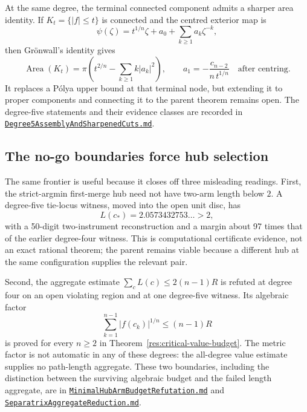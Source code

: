 At the same degree, the terminal connected component admits a sharper area
identity.  If $K_t=\{|f|\le t\}$ is connected and the centred exterior map is
\[
 \psi(\zeta)=t^{1/n}\zeta+a_0+
 \sum_{k\ge1}a_k\zeta^{-k},
\]
then Gr\"onwall's identity gives
\[
 \operatorname{Area}(K_t)=\pi\left(t^{2/n}-
 \sum_{k\ge1}k|a_k|^2\right),
 \qquad
 a_1=-\frac{c_{n-2}}{n\,t^{1/n}}
 \quad\text{after centring}.
\]
It replaces a P\'olya upper bound at that terminal node, but extending it to
proper components and connecting it to the parent theorem remains open.  The
degree-five statements and their evidence classes are recorded in
\href{https://github.com/wcook04/plectis-erdos/blob/f214a6b45528dc5eefe20ffadc35f2e981627d4c/research_corpus/Erdos1041/Degree5AssemblyAndSharpenedCuts.md}{\texttt{Degree5AssemblyAndSharpenedCuts.md}}.

\subsection*{The no-go boundaries force hub selection}

The same frontier is useful because it closes off three misleading readings.
First, the strict-argmin first-merge hub need not have two-arm length below
$2$.  A degree-five tie-locus witness, moved into the open unit disc, has
\[
 L(c_*)=2.0573432753\ldots>2,
\]
with a 50-digit two-instrument reconstruction and a margin about 97 times
that of the earlier degree-four witness.  This is computational certificate
evidence, not an exact rational theorem; the parent remains viable because a
different hub at the same configuration supplies the relevant pair.

Second, the aggregate estimate
$\sum_cL(c)\le2(n-1)R$ is refuted at degree four on an open violating region
and at one degree-five witness.  Its algebraic factor
\[
 \sum_{k=1}^{n-1}|f(c_k)|^{1/n}\le(n-1)R
\]
is proved for every $n\ge2$ in Theorem~\ref{res:critical-value-budget}.
The metric factor is not automatic in any of these degrees: the all-degree
value estimate supplies no path-length aggregate.
These two boundaries, including the distinction between the surviving
algebraic budget and the failed length aggregate, are in
\href{https://github.com/wcook04/plectis-erdos/blob/f214a6b45528dc5eefe20ffadc35f2e981627d4c/research_corpus/Erdos1041/MinimalHubArmBudgetRefutation.md}{\texttt{MinimalHubArmBudgetRefutation.md}}
and
\href{https://github.com/wcook04/plectis-erdos/blob/f214a6b45528dc5eefe20ffadc35f2e981627d4c/research_corpus/Erdos1041/SeparatrixAggregateReduction.md}{\texttt{SeparatrixAggregateReduction.md}}.

